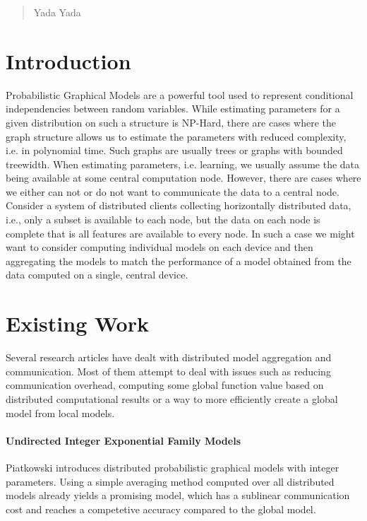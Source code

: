 \begin{abstract}
   Yada Yada
\end{abstract}
    
    \section{Introduction}
    Probabilistic Graphical Models are a powerful tool used to represent conditional independencies between random variables.
    While estimating parameters for a given distribution on such a structure is NP-Hard, there are cases where the graph structure allows us to estimate the parameters with reduced complexity, i.e. in polynomial time.
    Such graphs are usually trees or graphs with bounded treewidth.
    When estimating parameters, i.e. learning, we usually assume the data being available at some central computation node.
    However, there are cases where we either can not or do not want to communicate the data to a central node.
    Consider a system of distributed clients collecting horizontally distributed data, i.e., only a subset is available to each node, but the data on each node is complete that is all features are available to every node.
    In such a case we might want to consider computing individual models on each device and then aggregating the models to match the performance of a model obtained from the data computed on a single, central device.
    
    \section{Existing Work}
    Several research articles have dealt with distributed model aggregation and communication. 
    Most of them attempt to deal with issues such as reducing communication overhead, computing some global function value based on distributed computational results or a way to more efficiently create a global model from local models.

    \paragraph{Undirected Integer Exponential Family Models}
    Piatkowski \cite{piatkowskidistributed} introduces distributed probabilistic graphical models with integer parameters. 
    Using a simple averaging method computed over all distributed models already yields a promising model, which has a sublinear communication cost and reaches a competetive accuracy compared to the global model. 
    

